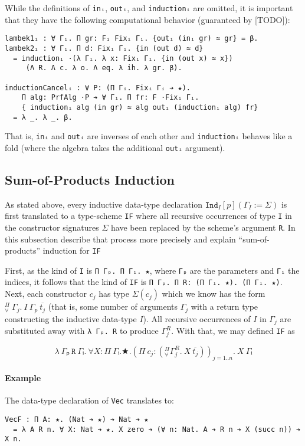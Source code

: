 \documentclass{article}
\newcommand{\indast}[4]{\texttt{Ind}_{#1} [#2] (#3 := #4)}
\newcommand{\vars}[1]{{\overline{#1}}}
\newcommand{\piforall}{^{\Pi}_{\forall}}
\begin{document}
While the definitions of \verb;inᵢ;, \verb;outᵢ;, and \verb;inductionᵢ; are
omitted, it is important that they have the following computational behavior
(guaranteed by [TODO]):
\begin{verbatim}
lambek1ᵢ : ∀ Γᵢ. Π gr: Fᵢ Fixᵢ Γᵢ. {outᵢ (inᵢ gr) ≃ gr} = β.
lambek2ᵢ : ∀ Γᵢ. Π d: Fixᵢ Γᵢ. {in (out d) ≃ d}
  = inductionᵢ ·(λ Γᵢ. λ x: Fixᵢ Γᵢ. {in (out x) ≃ x})
     (Λ R. Λ c. λ o. Λ eq. λ ih. λ gr. β).

inductionCancelᵢ : ∀ P: (Π Γᵢ. Fixᵢ Γᵢ ➔ ★).
    Π alg: PrfAlg ·P ➔ ∀ Γᵢ. Π fr: F ·Fixᵢ Γᵢ.
    { inductionᵢ alg (in gr) ≃ alg outᵢ (inductionᵢ alg) fr}
  = λ _. λ _. β.
\end{verbatim}
That is, \verb;inᵢ; and \verb;outᵢ; are inverses of each other and
\verb;inductionᵢ; behaves like a fold (where the algebra takes the additional
\verb;outᵢ; argument).

\subsection{Sum-of-Products Induction}
As stated above, every inductive data-type declaration
$\indast{I}{p}{Γ_I}{\Sigma}$ is first translated to a type-scheme \verb;IF;
where all recursive occurrences of type \verb;I; in the constructor signatures
$\Sigma$ have been replaced by the scheme's argument \verb;R;. In this
subsection describe that process more precisely and explain ``sum-of-products''
induction for \verb;IF;

First, as the kind of \verb;I; is \verb;Π Γₚ. Π Γᵢ. ★;, where \verb;Γₚ; are the
parameters and \verb;Γᵢ; the indices, it follows that the kind of \verb;IF; is
\verb;Π Γₚ. Π R: (Π Γᵢ. ★). (Π Γᵢ. ★);. Next, each constructor $c_j$ has type
$\Sigma(c_j)$ which we know has the form $\piforall\ \Gamma_j.\ I\ \Gamma_p\
\vars{t_j}$ (that is, some number of arguments $\Gamma_j$ with a return type
constructing the inductive data-type $I$). All recursive occurrences of $I$ in
$\Gamma_j$ are substituted away with \verb;λ Γₚ. R; to produce $Γ^R_j$. With
that, we may defined \verb;IF; as

\[ λ\ Γₚ\ \texttt{R}\ Γᵢ.\ ∀ X: Π\ Γᵢ. ★. (Π\ c_j: (\piforall Γ^R_j.\ X\
  \vars{t_j}))_{j=1..n}.\ X\ Γᵢ\]

\paragraph{Example}

The data-type declaration of \verb;Vec; translates to:
\begin{verbatim}
VecF : Π A: ★. (Nat ➔ ★) ➔ Nat ➔ ★
  = λ A R n. ∀ X: Nat ➔ ★. X zero ➔ (∀ n: Nat. A ➔ R n ➔ X (succ n)) ➔ X n.
\end{verbatim}
\end{document}
